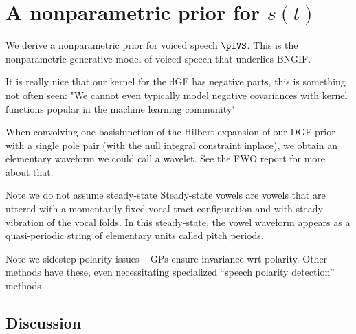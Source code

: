 \chapter{A nonparametric prior for $s(t)$\label{chapter:5}}

\begin{chaptersections}{%
We derive a nonparametric prior for voiced speech $\piVS$.
This is the nonparametric generative model of voiced speech that underlies BNGIF.
}

It is really nice that our kernel for the dGF has negative parts, this is something not often seen: "We cannot even typically model negative covariances with kernel functions popular in the machine learning community" \citep{Wilson2014}

When convolving one basisfunction of the Hilbert expansion of our DGF prior with a single pole pair (with the null integral constraint inplace), we obtain an elementary waveform we could call a wavelet.
See the FWO report for more about that.

Note we do not assume steady-state
Steady-state vowels are vowels that are uttered with a momentarily fixed vocal tract
configuration and with steady vibration of the vocal folds. In this steady-state, the vowel waveform
appears as a quasi-periodic string of elementary units called pitch periods.

Note we sidestep polarity issues -- GPs ensure invariance wrt polarity.
Other methods have these, even necessitating specialized ``speech polarity detection'' methods \citep[][Sec.~3.2]{Drugman2019a}

\section{Discussion}

\end{chaptersections}

